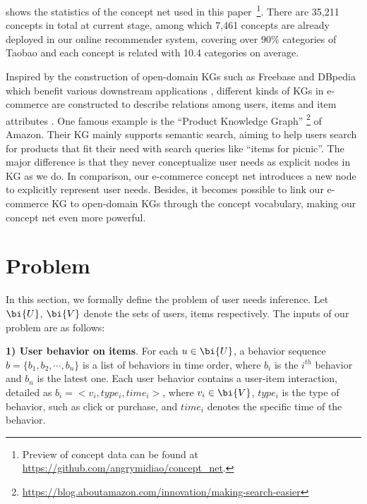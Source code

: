  shows the statistics of the concept net used in this
paper~\footnote{Preview of concept data can be found at \url{https://github.com/angrymidiao/concept_net}.}.
There are 35,211 concepts in total at current stage, 
among which 7,461 concepts are already deployed in our online recommender system, covering over 90\% categories of Taobao and each concept is related with 10.4 categories on average.

Inspired by the construction of open-domain KGs such as Freebase \cite{bollacker2008freebase} and DBpedia \cite{auer2007dbpedia} which benefit various downstream applications \cite{luo2018knowledge,luo2018cross}, different kinds of KGs in e-commerce are constructed
to describe relations among users, items and item attributes \cite{catherine2017explainable,ai2018learning,gong2019deep}.
One famous example is the ``Product Knowledge Graph'' \footnote{\url{https://blog.aboutamazon.com/innovation/making-search-easier}} of Amazon. Their KG mainly supports semantic search, aiming to help users search for products that fit their need with search queries like ``items for picnic''. The major difference is that they never conceptualize user needs as explicit nodes in KG as we do.
In comparison, our e-commerce concept net introduces a new node to explicitly represent user needs. Besides, it becomes possible to link our e-commerce KG to open-domain KGs through the concept vocabulary, %
making our concept net even more powerful.

\section{Problem}
\label{sec:problem}

In this section, we formally define the problem of user needs inference.
Let $\bi{U}$, $\bi{V}$ denote the sets of users, items respectively.
The inputs of our problem are as follows:

\noindent
\textbf{1) User behavior on items}. For each $u\in \bi{U}$,  a behavior sequence 
$b= \{b_1, b_2, \cdots, b_n\}$ is a list of behaviors in time order, 
where $b_i$ is the $i^{th}$ behavior and $b_n$ is the latest one. 
Each user behavior contains a user-item interaction, 
detailed as $b_i = <v_i, type_i, time_i>$, where $v_i \in \bi{V}$, 
$type_i$ is the type of behavior, such as click or purchase, and
$time_i$ denotes the specific time of the behavior.

